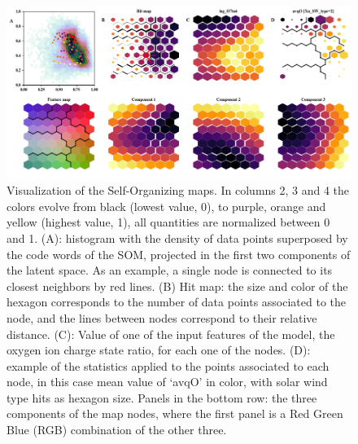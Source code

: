 \documentclass[utf8]{frontiersSCNS} %
\begin{document}
\begin{figure}[h!]
	\begin{center}
		\includegraphics[width=16cm]{Amaya/maps}%
	\end{center}
	\caption{Visualization of the Self-Organizing maps. In columns 2, 3 and 4 the colors evolve from black (lowest value, 0), to purple, orange and yellow (highest value, 1), all quantities are normalized between 0 and 1. (A): histogram with the density of data points superposed by the code words of the SOM, projected in the first two components of the latent space. As an example, a single node is connected to its closest neighbors by red lines. (B) Hit map: the size and color of the hexagon corresponds to the number of data points associated to the node, and the lines between nodes correspond to their relative distance. (C): Value of one of the input features of the model, the oxygen ion charge state ratio, for each one of the nodes. (D): example of the statistics applied to the points associated to each node, in this case mean value of `avqO' in color, with solar wind type hits as hexagon size. Panels in the bottom row: the three components of the map nodes, where the first panel is a Red Green Blue (RGB) combination of the other three.}\label{fig:maps}
\end{figure}
\end{document}
